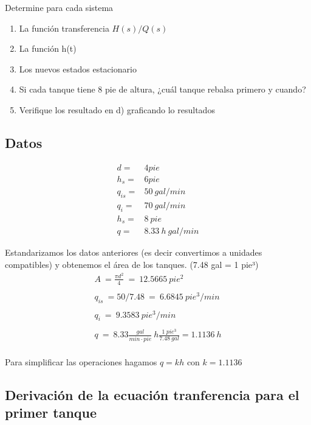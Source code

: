 \documentclass[
  letterpaper,
  DIV=11,
  numbers=noendperiod]{scrreprt}
\begin{document}
Determine para cada sistema

\begin{enumerate}
\def\labelenumi{\alph{enumi})}
\item
  La función transferencia \(H(s)/Q(s)\)
\item
  La función h(t)
\item
  Los nuevos estados estacionario
\item
  Si cada tanque tiene 8 pie de altura, ¿cuál tanque rebalsa primero y
  cuando?
\item
  Verifique los resultado en d) graficando lo resultados
\end{enumerate}

\hypertarget{datos}{%
\subsection{Datos}\label{datos}}

\[
\begin{array}{rl}
d = &4 pie\\
h_s= &6 pie\\
q_{is}=&50\ gal/min\\
q_i=&70\ gal/min\\
h_s=&8\ pie\\
q=&8.33\ h\ gal/min
\end{array}
\]

Estandarizamos los datos anteriores (es decir convertimos a unidades
compatibles) y obtenemos el área de los tanques. (7.48 gal = 1 pie³) \[
\begin{array}{l}
A\ = \frac{\pi d^2}{4}\ =\ 12.5665\ pie^2\\
\\
q_{is}\ =50/7.48\ =\ 6.6845\ pie^3/min\\
\\
q_i\ =\ 9.3583\ pie^3/min\\
\\
q\ =\ 8.33\frac{gal}{min\cdot pie}\ h \frac{1\ pie^3}{7.48\ gal} = 1.1136\ h\\
\end{array}
\]

Para simplificar las operaciones hagamos \(q=kh\) con \(k=1.1136\)

\hypertarget{derivaciuxf3n-de-la-ecuaciuxf3n-tranferencia-para-el-primer-tanque}{%
\subsection{Derivación de la ecuación tranferencia para el primer
tanque}\label{derivaciuxf3n-de-la-ecuaciuxf3n-tranferencia-para-el-primer-tanque}}
\end{document}
